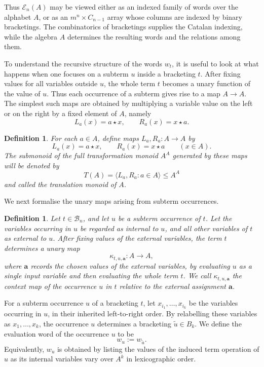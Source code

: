 \documentclass[11pt]{article}
\newtheorem{definition}[theorem]{Definition}
\begin{document}
Thus \(\mathcal E_n(A)\) may be viewed either as an indexed family of words over
the alphabet \(A\), or as an \(m^n\times C_{n-1}\) array whose columns are
indexed by binary bracketings. The combinatorics of bracketings supplies the
Catalan indexing, while the algebra \(A\) determines the resulting words and the
relations among them.

To understand the recursive structure of the words \(w_t\), it is useful to
look at what happens when one focuses on a subterm \(u\) inside a bracketing
\(t\). After fixing values for all variables outside \(u\), the whole term \(t\)
becomes a unary function of the value of \(u\). Thus each occurrence of a
subterm gives rise to a map \(A\to A\). The simplest such maps are obtained by
multiplying a variable value on the left or on the right by a fixed element of
\(A\), namely
\[
L_a(x)=a\star x,\qquad R_a(x)=x\star a.
\]




\begin{definition}
For each \(a\in A\), define maps \(L_a,R_a:A\to A\) by
\[
L_a(x)=a\star x,
\qquad
R_a(x)=x\star a
\qquad (x\in A).
\]
The submonoid of the full transformation monoid \(A^A\) generated by these maps
will be denoted by
\[
T(A)=\langle L_a,R_a : a\in A\rangle \leq A^A
\]
and called the \emph{translation monoid} of \(A\).
\end{definition}

We next formalise the unary maps arising from subterm occurrences.

\begin{definition}
Let \(t\in \mathcal B_n\), and let \(u\) be a subterm occurrence of \(t\). Let
the variables occurring in \(u\) be regarded as internal to \(u\), and all other
variables of \(t\) as external to \(u\). After fixing values of the external
variables, the term \(t\) determines a unary map
\[
\kappa_{t,u,\mathbf a}:A\to A,
\]
where \(\mathbf a\) records the chosen values of the external variables, by
evaluating \(u\) as a single input variable and then evaluating the whole term
\(t\). We call \(\kappa_{t,u,\mathbf a}\) the \emph{context map} of the
occurrence \(u\) in \(t\) relative to the external assignment \(\mathbf a\).
\end{definition}


For a subterm occurrence \(u\) of a bracketing \(t\), let \(x_{i_1},\dots,x_{i_k}\) be the
variables occurring in \(u\), in their inherited left-to-right order. By relabelling these
variables as \(x_1,\dots,x_k\), the occurrence \(u\) determines a bracketing
\(\widetilde{u}\in B_k\). We define the evaluation word of the occurrence \(u\) to be
\[
w_u:=w_{\widetilde{u}}.
\]
Equivalently, \(w_u\) is obtained by listing the values of the induced term operation of \(u\)
as its internal variables vary over \(A^k\) in lexicographic order.
\end{document}
